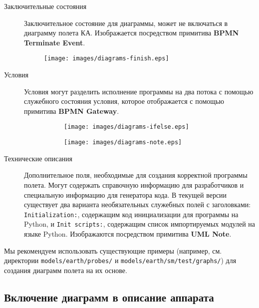 \documentclass[12pt,a4paper]{article}
\begin{document}
\begin{description}
\item[Заключительные состояния] Заключительное состояние для диаграммы, может не
  включаться в диаграмму полета КА. Изображается посредством примитива \textbf{BPMN
    Terminate Event}.

\begin{figure}[h]
  \begin{center}
    \texttt{[image: images/diagrams-finish.eps]}
  \end{center}
\end{figure}

\item[Условия] Условия могут разделить исполнение программы на два потока с помощью
  служебного состояния условия, которое отображается с помощью примитива \textbf{BPMN
    Gateway}.
  
\begin{figure}[h]
  \begin{center}
    \begin{subfigure}{0.4\textwidth}
      \texttt{[image: images/diagrams-ifelse.eps]}
    \end{subfigure}
    \hfill
    \begin{subfigure}{0.4\textwidth}
      \texttt{[image: images/diagrams-note.eps]}
    \end{subfigure}
  \end{center}
\end{figure}

\item[Технические описания] Дополнительное поля, необходимые для создания корректной
  программы полета. Могут содержать справочную информацию для разработчиков и специальную
  информацию для генератора кода. В текущей версии существует два варианта необязательных
  служебных полей с заголовками: \verb'Initialization:', содержащим код инициализации для
  программы на Python, и \verb'Init scripts:', содержащим список импортируемых модулей на
  языке Python. Изображаются посредством примитива \textbf{UML Note}.

\end{description}

Мы рекомендуем использовать существующие примеры (например, см. директории
\verb'models/earth/probes/' и \verb'models/earth/sm/test/graphs/') для создания диаграмм
полета на их основе.

\subsection*{Включение диаграмм в описание аппарата}
\end{document}
